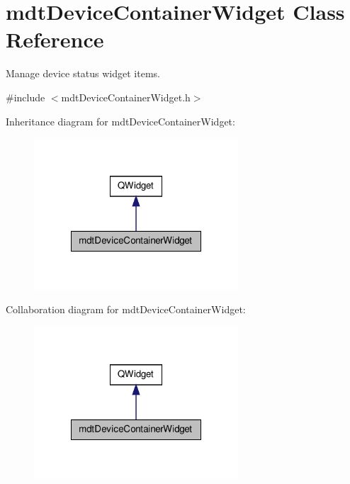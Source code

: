 \hypertarget{classmdt_device_container_widget}{\section{mdt\-Device\-Container\-Widget Class Reference}
\label{classmdt_device_container_widget}
}


Manage device status widget items.  




{\ttfamily \#include $<$mdt\-Device\-Container\-Widget.\-h$>$}



Inheritance diagram for mdt\-Device\-Container\-Widget\-:\nopagebreak
\begin{figure}[H]
\begin{center}
\leavevmode
\includegraphics[width=216pt]{classmdt_device_container_widget__inherit__graph}
\end{center}
\end{figure}


Collaboration diagram for mdt\-Device\-Container\-Widget\-:\nopagebreak
\begin{figure}[H]
\begin{center}
\leavevmode
\includegraphics[width=216pt]{classmdt_device_container_widget__coll__graph}
\end{center}
\end{figure}
